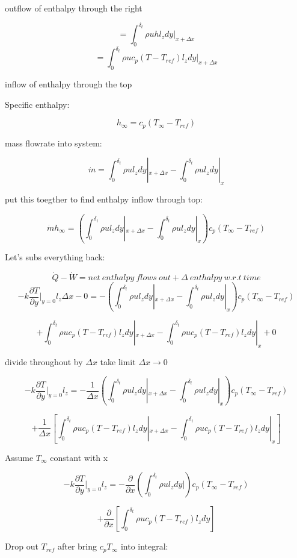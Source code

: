 \documentclass[11pt]{article}
\begin{document}
outflow of enthalpy through the right


$$= \int_0^{\delta_t} \rho u h l_z dy |_{x+\Delta x}$$
$$= \int_0^{\delta_t} \rho u c_p (T-T_{ref}) l_z dy |_{x+\Delta x}$$



inflow of enthalpy through the top

Specific enthalpy:

$$h_\infty = c_p (T_\infty - T_{ref})$$


mass flowrate into system:

$$\dot{m} = \int_0^{\delta_t} \rho u l_z dy |_{x+\Delta x} - \int_0^{\delta_t} \rho u l_z dy |_{x}$$

put this toegther to find enthalpy inflow through top: 

$$\dot{m} h_\infty = (\int_0^{\delta_t} \rho u l_z dy |_{x+\Delta x} - \int_0^{\delta_t} \rho u l_z dy |_{x}) c_p (T_\infty - T_{ref})$$

Let's subs everything back:


$$\dot{Q} - \dot{W} = net \ enthalpy \ flows  \ out +  \Delta \ enthalpy \ w.r.t \ time$$
$$- k \frac{\partial T}{\partial y} |_{y=0} l_z \Delta x - 0 = -(\int_0^{\delta_t} \rho u l_z dy |_{x+\Delta x} - \int_0^{\delta_t} \rho u l_z dy |_{x}) c_p (T_\infty - T_{ref}) $$

$$+ \int_0^{\delta_t} \rho u c_p (T-T_{ref}) l_z dy |_{x+\Delta x} -  \int_0^{\delta_t} \rho u c_p (T-T_{ref}) l_z dy |_{x}+  0$$



divide throughout by $\Delta x$ take limit $\Delta x \rightarrow 0$


$$- k \frac{\partial T}{\partial y} |_{y=0} l_z  = - \frac{1}{\Delta x} (\int_0^{\delta_t} \rho u l_z dy |_{x+\Delta x} - \int_0^{\delta_t} \rho u l_z dy |_{x}) c_p (T_\infty - T_{ref}) $$

$$+ \frac{1}{\Delta x} [ \int_0^{\delta_t} \rho u c_p (T-T_{ref}) l_z dy |_{x+\Delta x} -  \int_0^{\delta_t} \rho u c_p (T-T_{ref}) l_z dy |_{x}]$$

Assume $T_\infty $ constant with x


$$- k \frac{\partial T}{\partial y} |_{y=0} l_z   = - \frac{\partial}{\partial x} (\int_0^{\delta_t} \rho u l_z dy |) c_p (T_\infty - T_{ref}) $$

$$+ \frac{\partial}{\partial x} [ \int_0^{\delta_t} \rho u c_p (T-T_{ref}) l_z dy ]$$

Drop out $T_{ref}$ after bring $c_p T_\infty $ into integral:
\end{document}

